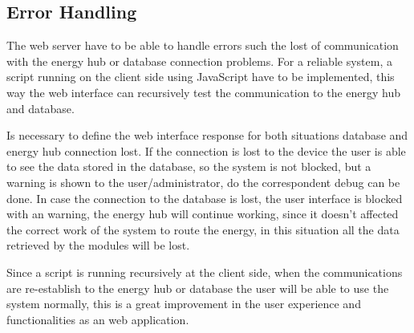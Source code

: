 \subsection{Error Handling}
The web server have to be able to handle errors such the lost of communication with the energy hub or database connection problems. For a reliable system, a script running on the client side using JavaScript have to be implemented, this way the web interface can recursively test the communication to the energy hub and database.

Is necessary to define the web interface response for both situations database and energy hub connection lost. If the connection is lost to the device the user is able to see the data stored in the database, so the system is not blocked, but a warning is shown to the user/administrator, do the correspondent debug can be done. In case the connection to the database is lost, the user interface is blocked with an warning, the energy hub will continue working, since it doesn't affected the correct work of the system to route the energy, in this situation all the data retrieved by the modules will be lost.

Since a script is running recursively at the client side, when the communications are re-establish to the energy hub or database the user will be able to use the system normally, this is a great improvement in the user experience and functionalities as an web application.
